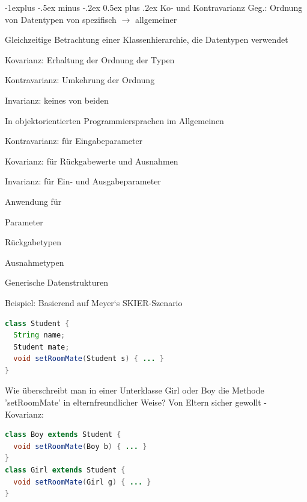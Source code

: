 \documentclass[10pt]{article}
\makeatletter
\renewcommand{\subsection}{\@startsection{subsection}{2}{0mm}%
                                {-1explus -.5ex minus -.2ex}%
                                {0.5ex plus .2ex}%
                                {\normalfont\normalsize\bfseries}}
\makeatother
\begin{document}
\subsection{Ko- und Kontravarianz}
Geg.: Ordnung von Datentypen von spezifisch $\rightarrow$ allgemeiner

\begin{itemize*}
  \item Gleichzeitige Betrachtung einer Klassenhierarchie, die Datentypen verwendet
  \begin{itemize*}
    \item Kovarianz: Erhaltung der Ordnung der Typen
    \item Kontravarianz: Umkehrung der Ordnung
    \item Invarianz: keines von beiden
  \end{itemize*}
  \item In objektorientierten Programmiersprachen im Allgemeinen
  \begin{itemize*}
    \item Kontravarianz: für Eingabeparameter
    \item Kovarianz: für Rückgabewerte und Ausnahmen
    \item Invarianz: für Ein- und Ausgabeparameter
  \end{itemize*}
  \item Anwendung für
  \begin{itemize*}
    \item Parameter
    \item Rückgabetypen
    \item Ausnahmetypen
    \item Generische Datenstrukturen
  \end{itemize*}
\end{itemize*}

Beispiel: Basierend auf Meyer‘s SKIER-Szenario
\begin{lstlisting}[language=java]
class Student {
  String name;
  Student mate;
  void setRoomMate(Student s) { ... }
}
\end{lstlisting}

Wie überschreibt man in einer Unterklasse Girl oder Boy die Methode 'setRoomMate' in elternfreundlicher Weise? Von Eltern sicher gewollt - Kovarianz:
\begin{lstlisting}[language=java]
class Boy extends Student {
  void setRoomMate(Boy b) { ... }
}
class Girl extends Student {
  void setRoomMate(Girl g) { ... }
}
\end{lstlisting}
\end{document}
